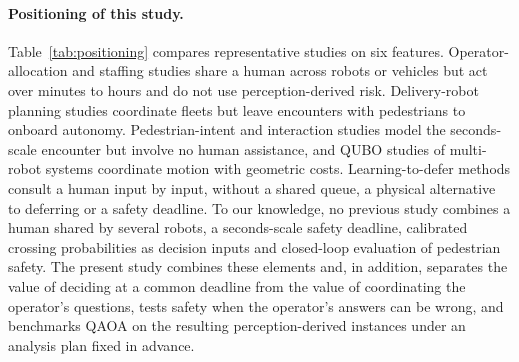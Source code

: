 \documentclass[a4paper,fleqn]{cas-dc}
\begin{document}
\paragraph{Positioning of this study.}
Table~\ref{tab:positioning} compares representative studies on six features. Operator-allocation and staffing studies share a human across robots or vehicles but act over minutes to hours and do not use perception-derived risk. Delivery-robot planning studies coordinate fleets but leave encounters with pedestrians to onboard autonomy. Pedestrian-intent and interaction studies model the seconds-scale encounter but involve no human assistance, and QUBO studies of multi-robot systems coordinate motion with geometric costs. Learning-to-defer methods consult a human input by input, without a shared queue, a physical alternative to deferring or a safety deadline. To our knowledge, no previous study combines a human shared by several robots, a seconds-scale safety deadline, calibrated crossing probabilities as decision inputs and closed-loop evaluation of pedestrian safety. The present study combines these elements and, in addition, separates the value of deciding at a common deadline from the value of coordinating the operator's questions, tests safety when the operator's answers can be wrong, and benchmarks QAOA on the resulting perception-derived instances under an analysis plan fixed in advance.
\end{document}
